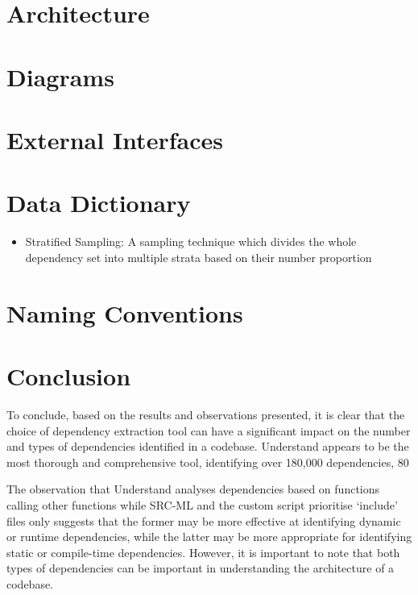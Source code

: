 \documentclass[12pt, dvipsnames, a4paper]{article}
\begin{document}
\section{Architecture}
\lipsum[1]

\section{Diagrams}
\lipsum[1]

\section{External Interfaces}
\lipsum[1]

\section{Data Dictionary}
\begin{itemize}
	\item{Stratified Sampling: A sampling technique which divides the whole dependency set into multiple strata based on their number proportion}
\end{itemize}

\section{Naming Conventions}
\lipsum[1]

\section{Conclusion}
To conclude, based on the results and observations presented, it is clear that the choice of dependency extraction tool can have a significant impact on the number and types of dependencies identified in a codebase. Understand appears to be the most thorough and comprehensive tool, identifying over 180,000 dependencies, 80%

The observation that Understand analyses dependencies based on functions calling other functions while SRC-ML and the custom script prioritise ‘include’ files only suggests that the former may be more effective at identifying dynamic or runtime dependencies, while the latter may be more appropriate for identifying static or compile-time dependencies. However, it is important to note that both types of dependencies can be important in understanding the architecture of a codebase.
\end{document}
